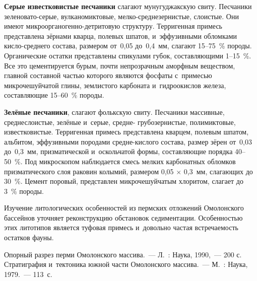 \textbf{Серые известковистые песчаники} слагают мунугуджакскую свиту. Песчаники зе\-ле\-но\-ва\-то-серые, вулканомиктовые, мелко-среднезернистые, слоистые. Они имеют микро\-ор\-га\-но\-ген\-но-детритовую структуру. Терригенная примесь представлена зёрнами кварца, полевых шпатов, и~эффузивными обломками кисло-среднего состава, размером от~0,05 до~0,4~мм, слагают 15--75~\% породы. Органические остатки представлены спикулами губок, составляющими 1--15~\%. Все это цементируется бурым, почти непрозрачным аморфным веществом, главной составной частью которого являются фосфаты с~примесью микрочешуйчатой глины, землистого карбоната и~гидроокислов железа, составляющие 15--60~\% породы.

\textbf{Зелёные песчаники}, слагают фолькскую свиту. Песчаники массивные, среднеслоистые, зелёные и~серые, средне- грубозернистые, полимиктовые, известковистые. Терригенная примесь представлена кварцем, полевым шпатом, альбитом, эффузивными породами средне-кислого состава, размер зёрен от~0,03 до~0,3~мм, призматической и~оскольчатой формы, составляющие порядка 40--50~\%. Под микроскопом наблюдается смесь мелких карбонатных обломков призматического слоя раковин колымий, размером 0,05 $\times$ 0,3~мм, слагающих до 30~\%. Цемент поровый, представлен микрочешуйчатым хлоритом, слагает до 3~\% породы.

Изучение литологических особенностей из пермских отложений Омолонского бассейнов уточняет реконструкцию обстановок седиментации. Особенностью этих литотипов является туфовая примесь и~довольно частая встречаемость остатков фауны.

\begin{thebibliography}{99}

\bibitem{} Опорный разрез перми Омолонского массива.~--- Л.~: Наука, 1990,~--- 200 с.
\bibitem{} Стратиграфия и~тектоника южной части Омолонского массива.~--- М.~: Наука, 1979.~--- 113~с.
\end{thebibliography}
\thispagestyle{empty}
